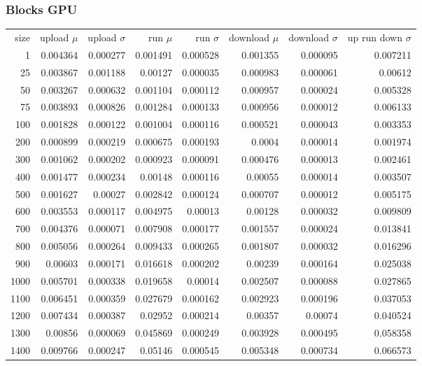 \subsubsection{Blocks GPU}

\begin{longtable}{r r r r r r r r}
size & upload $\mu$  & upload $\sigma$ & run $\mu$ & run $\sigma$ & download $\mu$ & download $\sigma$ & up run down $\sigma$ \\
1 & 0.004364 & 0.000277 & 0.001491 & 0.000528 & 0.001355 & 0.000095 & 0.007211 \\
25 & 0.003867 & 0.001188 & 0.00127 & 0.000035 & 0.000983 & 0.000061 & 0.00612 \\
50 & 0.003267 & 0.000632 & 0.001104 & 0.000112 & 0.000957 & 0.000024 & 0.005328 \\
75 & 0.003893 & 0.000826 & 0.001284 & 0.000133 & 0.000956 & 0.000012 & 0.006133 \\
100 & 0.001828 & 0.000122 & 0.001004 & 0.000116 & 0.000521 & 0.000043 & 0.003353 \\
200 & 0.000899 & 0.000219 & 0.000675 & 0.000193 & 0.0004 & 0.000014 & 0.001974 \\
300 & 0.001062 & 0.000202 & 0.000923 & 0.000091 & 0.000476 & 0.000013 & 0.002461 \\
400 & 0.001477 & 0.000234 & 0.00148 & 0.000116 & 0.00055 & 0.000014 & 0.003507 \\
500 & 0.001627 & 0.00027 & 0.002842 & 0.000124 & 0.000707 & 0.000012 & 0.005175 \\
600 & 0.003553 & 0.000117 & 0.004975 & 0.00013 & 0.00128 & 0.000032 & 0.009809 \\
700 & 0.004376 & 0.000071 & 0.007908 & 0.000177 & 0.001557 & 0.000024 & 0.013841 \\
800 & 0.005056 & 0.000264 & 0.009433 & 0.000265 & 0.001807 & 0.000032 & 0.016296 \\
900 & 0.00603 & 0.000171 & 0.016618 & 0.000202 & 0.00239 & 0.000164 & 0.025038 \\
1000 & 0.005701 & 0.000338 & 0.019658 & 0.00014 & 0.002507 & 0.000088 & 0.027865 \\
1100 & 0.006451 & 0.000359 & 0.027679 & 0.000162 & 0.002923 & 0.000196 & 0.037053 \\
1200 & 0.007434 & 0.000387 & 0.02952 & 0.000214 & 0.00357 & 0.00074 & 0.040524 \\
1300 & 0.00856 & 0.000069 & 0.045869 & 0.000249 & 0.003928 & 0.000495 & 0.058358 \\
1400 & 0.009766 & 0.000247 & 0.05146 & 0.000545 & 0.005348 & 0.000734 & 0.066573 \\

\end{longtable}
